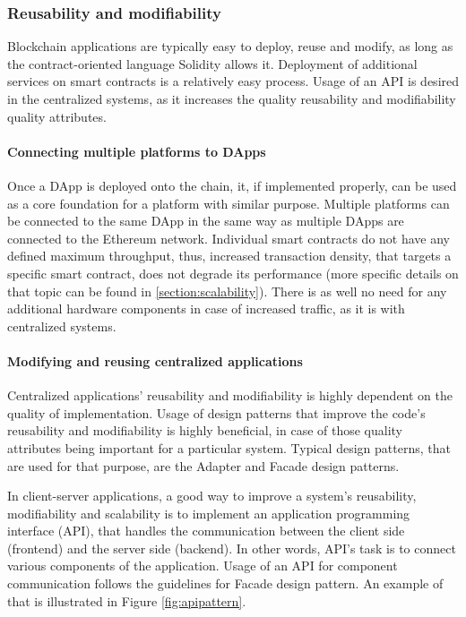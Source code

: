 \subsubsection{Reusability and modifiability} \label{section:reuse}
Blockchain applications are typically easy to deploy, reuse and modify, as long as the contract-oriented language Solidity allows it. Deployment of additional services on smart contracts is a relatively easy process. Usage of an API is desired in the centralized systems, as it increases the quality reusability and modifiability quality attributes.

\paragraph{Connecting multiple platforms to DApps}
Once a DApp is deployed onto the chain, it, if implemented properly, can be used as a core foundation for a platform with similar purpose. Multiple platforms can be connected to the same DApp in the same way as multiple DApps are connected to the Ethereum network. Individual smart contracts do not have any defined maximum throughput, thus, increased transaction density, that targets a specific smart contract, does not degrade its performance (more specific details on that topic can be found in \ref{section:scalability}). There is as well no need for any additional hardware components in case of increased traffic, as it is with centralized systems.

\paragraph{Modifying and reusing centralized applications}
Centralized applications' reusability and modifiability is highly dependent on the quality of implementation. Usage of design patterns that improve the code's reusability and modifiability is highly beneficial, in case of those quality attributes being important for a particular system. Typical design patterns, that are used for that purpose, are the Adapter and Facade design patterns.

In client-server applications, a good way to improve a system's reusability, modifiability and scalability is to implement an application programming interface (API), that handles the communication between the client side (frontend) and the server side (backend). In other words, API's task is to connect various components of the application. Usage of an API for component communication follows the guidelines for Facade design pattern. An example of that is illustrated in Figure \ref{fig:apipattern}.

